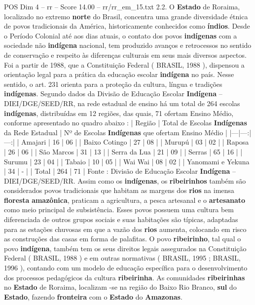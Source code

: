 \begin{textsample}{POS Dim 4 – rr – Score 14.00 – rr/rr\_em\_15.txt}  \label{ex:f4_pos_114}
2.2.
O \textbf{Estado} de Roraima, localizado no extremo \textbf{norte} do Brasil, concentra uma grande diversidade étnica de povos tradicionais da América, historicamente conhecidos como \textbf{índios}.
Desde o Período Colonial até aos dias atuais, o contato dos povos \textbf{indígenas} com a sociedade não \textbf{indígena} nacional, tem produzido avanços e retrocessos no sentido de conservação e respeito às diferenças culturais em seus mais diversos aspectos.
Foi a partir de 1988, que a Constituição Federal ( BRASIL, 1988 ), dispensou a orientação legal para a prática da educação escolar \textbf{indígena} no país.
Nesse sentido, o art. 231 orienta para a proteção da cultura, língua e tradições \textbf{indígenas}.
Segundo dados da Divisão de Educação Escolar \textbf{Indígena} – DIEI/DGE/SEED/RR, na rede estadual de ensino há um total de 264 escolas \textbf{indígenas}, distribuídas em 12 regiões, das quais, 71 ofertam Ensino Médio, conforme apresentado no quadro abaixo : | Região | Total de Escolas \textbf{Indígenas} da Rede Estadual | Nº de Escolas \textbf{Indígenas} que ofertam Ensino Médio | |---|---:|---:| | Amajari | 16 | 06 | | Baixo Cotingo | 27 | 08 | | Murupú | 03 | 02 | | Raposa | 26 | 06 | | São Marcos | 31 | 13 | | Serra da Lua | 21 | 09 | | Serras | 65 | 16 | | Surumu | 23 | 04 | | Tabaio | 10 | 05 | | Wai Wai | 08 | 02 | | Yanomami e Yekuna | 34 | - | | Total | 264 | 71 | Fonte : Divisão de Educação Escolar \textbf{Indígena} – DIEI/DGE/SEED/RR.
Assim como os \textbf{indígenas}, os \textbf{ribeirinhos} também são considerados povos tradicionais que habitam as margens dos \textbf{rios} na imensa \textbf{floresta} \textbf{amazônica}, praticam a agricultura, a pesca artesanal e o \textbf{artesanato} como meio principal de subsistência.
Esses povos possuem uma cultura bem diferenciada de outros grupos sociais e suas habitações são típicas, adaptadas para as estações chuvosas em que a vazão dos \textbf{rios} aumenta, colocando em risco as construções das casas em forma de palafitas.
O povo \textbf{ribeirinho}, tal qual o povo \textbf{indígena}, também tem os seus direitos legais assegurados na Constituição Federal ( BRASIL, 1988 ) e em outras normativas ( BRASIL, 1995 ; BRASIL, 1996 ), contando com um modelo de educação específica para o desenvolvimento dos processos pedagógicos da cultura \textbf{ribeirinha}.
As comunidades \textbf{ribeirinhas} no \textbf{Estado} de Roraima, localizam -se na região do Baixo Rio Branco, \textbf{sul} do \textbf{Estado}, fazendo \textbf{fronteira} com o \textbf{Estado} do \textbf{Amazonas}.

\end{textsample}
